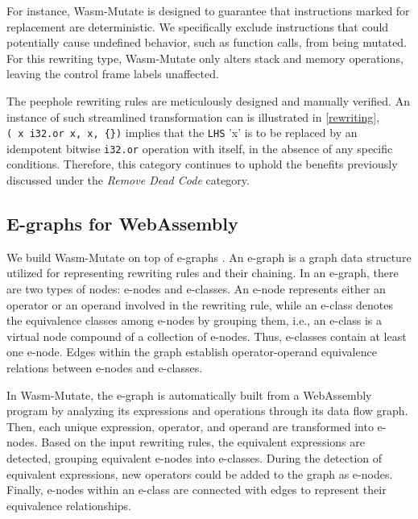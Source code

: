 \documentclass[a4paper,fleqn]{cas-dc}
\newcommand*\badge[1]{ \colorbox{red}{\color{white}#1}}
\newcommand{\tool}{{\sc Wasm-Mutate}\xspace}
\newcommand{\todo}[1]{%
\refstepcounter{todo}
\noindent\textbf{\badge{TODO}} {\color{red}#1}
\addcontentsline{td}{todo}
{\color{red}\thesection.\thetodo\xspace #1}}
\begin{document}
For instance, \tool is designed to guarantee that instructions marked for replacement are deterministic. 
We specifically exclude instructions that could potentially cause undefined behavior, such as function calls, from being mutated. 
For this rewriting type, \tool only alters stack and memory operations, leaving the control frame labels unaffected.

The peephole rewriting rules are meticulously designed and manually verified. 
An instance of such streamlined transformation can is illustrated in \autoref{rewriting}, \texttt{(\ x\ i32.or\ x, x, \{\})} implies that the \texttt{LHS} 'x' is to be replaced by an idempotent bitwise \texttt{i32.or} operation with itself, in the absence of any specific conditions.
Therefore, this category continues to uphold the benefits previously discussed under the \emph{Remove Dead Code} category.


\subsection{E-graphs for WebAssembly}
\label{alg}

We build \tool on top of e-graphs \cite{10.1145/3571207}.
An e-graph is a graph data structure utilized for representing rewriting rules and their chaining. 
In an e-graph, there are two types of nodes: e-nodes and e-classes. 
An e-node represents either an operator or an operand involved in the rewriting rule, while an e-class denotes the equivalence classes among e-nodes by grouping them, i.e., an e-class is a virtual node compound of a collection of e-nodes. 
Thus, e-classes contain at least one e-node.
Edges within the graph establish operator-operand equivalence relations between e-nodes and e-classes.

In \tool, the e-graph is automatically built from a WebAssembly program by analyzing its expressions and operations through its data flow graph.
Then, each unique expression, operator, and operand are transformed into e-nodes.
Based on the input rewriting rules, the equivalent expressions are detected, grouping equivalent e-nodes into e-classes.
During the detection of equivalent expressions, new operators could be added to the graph as e-nodes.
Finally, e-nodes within an e-class are connected with edges to represent their equivalence relationships.
\end{document}
